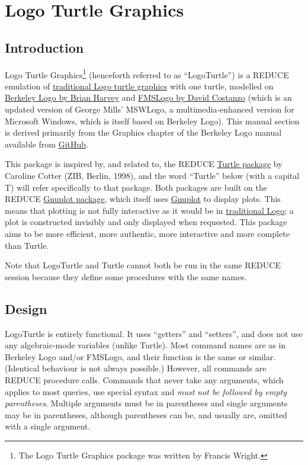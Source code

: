\section{Logo Turtle Graphics}


\subsection{Introduction}

Logo Turtle Graphics\footnote{The Logo Turtle Graphics package was
written by Francis Wright.} (henceforth referred to as ``LogoTurtle'')
is a REDUCE emulation of
\href{https://en.wikipedia.org/wiki/Turtle_graphics}{traditional Logo
  turtle graphics} with one turtle, modelled on
\href{http://people.eecs.berkeley.edu/~bh/logo.html}{Berkeley Logo by
  Brian Harvey} and \href{https://fmslogo.sourceforge.io/}{FMSLogo by
  David Costanzo} (which is an updated version of George Mills'
MSWLogo, a multimedia-enhanced version for Microsoft Windows, which is
itself based on Berkeley Logo).  This manual section is derived
primarily from the Graphics chapter of the Berkeley Logo manual
available from
\href{https://github.com/jrincayc/ucblogo-code}{GitHub}.

This package is inspired by, and related to, the REDUCE
\hyperref[package:TURTLE]{Turtle package} by Caroline Cotter (ZIB,
Berlin, 1998), and the word ``Turtle'' below (with a capital T) will
refer specifically to that package.  Both packages are built on the
REDUCE \hyperref[package:GNUPLOT]{Gnuplot package}, which itself uses
\href{http://gnuplot.info/}{Gnuplot} to display plots.  This means
that plotting is not fully interactive as it would be in
\href{https://en.wikipedia.org/wiki/Logo_(programming_language)}{traditional
  Logo}; a plot is constructed invisibly and only displayed when
requested.  This package aims to be more efficient, more authentic,
more interactive and more complete than Turtle.

Note that LogoTurtle and Turtle cannot both be run in the same REDUCE
session because they define some procedures with the same names.


\subsection{Design}

LogoTurtle is entirely functional.  It uses ``getters'' and
``setters'', and does not use any algebraic-mode variables (unlike
Turtle).  Most command names are as in Berkeley Logo and/or FMSLogo,
and their function is the same or similar.  (Identical behaviour is
not always possible.)  However, all commands are REDUCE procedure
calls.  Commands that never take any arguments, which applies to most
queries, use special syntax and \emph{must not be followed by empty
parentheses}.  Multiple arguments must be in parentheses and single
arguments may be in parentheses, although parentheses can be, and
usually are, omitted with a single argument.

